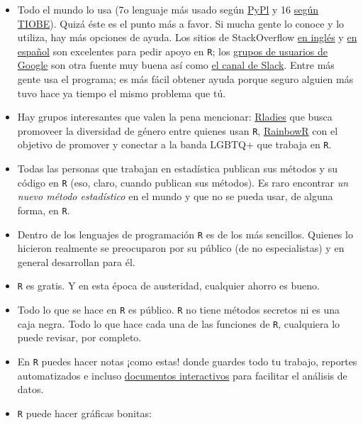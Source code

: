 \documentclass[]{tufte-book}
\begin{document}
\begin{itemize}
\item
  Todo el mundo lo usa (7o lenguaje más usado según
  \href{https://pypl.github.io/PYPL.html}{PyPl} y 16
  \href{https://www.tiobe.com/tiobe-index/}{según TIOBE}). Quizá éste es
  el punto más a favor. Si mucha gente lo conoce y lo utiliza, hay más
  opciones de ayuda. Los sitios de StackOverflow
  \href{https://stackoverflow.com}{en inglés} y
  \href{https://es.stackoverflow.com}{en español} son excelentes para
  pedir apoyo en \texttt{R}; los
  \href{https://groups.google.com/forum/\#!forum/r-help-archive}{grupos
  de usuarios de Google} son otra fuente muy buena así como
  \href{https://r-contributors.slack.com}{el canal de Slack}. Entre más
  gente usa el programa; es más fácil obtener ayuda porque seguro
  alguien más tuvo hace ya tiempo el mismo problema que tú.
\item
  Hay grupos interesantes que valen la pena mencionar:
  \href{https://rladies.org/}{Rladies} que busca promoveer la diversidad
  de género entre quienes usan \texttt{R},
  \href{https://rainbowr.netlify.app/}{RainbowR} con el objetivo de
  promover y conectar a la banda LGBTQ+ que trabaja en \texttt{R}.
\item
  Todas las personas que trabajan en estadística publican sus métodos y
  su código en \texttt{R} (eso, claro, cuando publican sus métodos). Es
  raro encontrar \emph{un nuevo método estadístico} en el mundo y que no
  se pueda usar, de alguna forma, en \texttt{R}.
\item
  Dentro de los lenguajes de programación \texttt{R} es de los más
  sencillos. Quienes lo hicieron realmente se preocuparon por su público
  (de no especialistas) y en general desarrollan para él.
\item
  \texttt{R} es gratis. Y en esta época de austeridad, cualquier ahorro
  es bueno.
\item
  Todo lo que se hace en \texttt{R} es público. \texttt{R} no tiene
  métodos secretos ni es una caja negra. Todo lo que hace cada una de
  las funciones de \texttt{R}, cualquiera lo puede revisar, por
  completo.
\item
  En \texttt{R} puedes hacer notas ¡como estas! donde guardes todo tu
  trabajo, reportes automatizados e incluso
  \href{https://gallery.shinyapps.io/086-bus-dashboard/}{documentos
  interactivos} para facilitar el análisis de datos.
\item
  \texttt{R} puede hacer gráficas bonitas:
\end{itemize}
\end{document}
